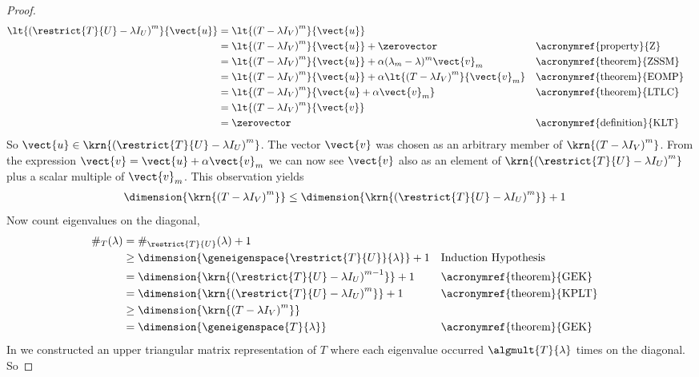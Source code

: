 \begin{proof}
\begin{align*}
\lt{\left(\restrict{T}{U}-\lambda I_U\right)^m}{\vect{u}}
&=
\lt{\left(T-\lambda I_V\right)^m}{\vect{u}}\\
%
&=
\lt{\left(T-\lambda I_V\right)^m}{\vect{u}}+\zerovector
&&\text{\acronymref{property}{Z}}\\
%
&=
\lt{\left(T-\lambda I_V\right)^m}{\vect{u}}+\alpha(\lambda_m-\lambda)^m\vect{v}_m
&&\text{\acronymref{theorem}{ZSSM}}\\
%
&=
\lt{\left(T-\lambda I_V\right)^m}{\vect{u}}+\alpha\lt{\left(T-\lambda I_V\right)^m}{\vect{v}_m}
&&\text{\acronymref{theorem}{EOMP}}\\
%
&=
\lt{\left(T-\lambda I_V\right)^m}{\vect{u}+\alpha\vect{v}_m}
&&\text{\acronymref{theorem}{LTLC}}\\
%
&=
\lt{\left(T-\lambda I_V\right)^m}{\vect{v}}\\
%
&=\zerovector
&&\text{\acronymref{definition}{KLT}}
%
\end{align*}
%
So $\vect{u}\in\krn{\left(\restrict{T}{U}-\lambda I_U\right)^m}$.  The vector $\vect{v}$ was chosen as an arbitrary member of
$\krn{\left(T-\lambda I_V\right)^m}$.  From the expression $\vect{v}=\vect{u}+\alpha\vect{v}_m$ we can now see $\vect{v}$ also as an element of $\krn{\left(\restrict{T}{U}-\lambda I_U\right)^m}$ plus a scalar multiple of  $\vect{v}_m$.  This observation yields
%
\begin{align*}
\dimension{\krn{\left(T-\lambda I_V\right)^m}}&\leq\dimension{\krn{\left(\restrict{T}{U}-\lambda I_U\right)^m}}+1
\end{align*}
%
Now count eigenvalues on the diagonal,
%
\begin{align*}
\#_{T}(\lambda)
&=\#_{\restrict{T}{U}}(\lambda)+1\\
%
&\geq\dimension{\geneigenspace{\restrict{T}{U}}{\lambda}}+1
&&\text{Induction Hypothesis}\\
%
&=\dimension{\krn{\left(\restrict{T}{U}-\lambda I_U\right)^{m-1}}}+1
&&\text{\acronymref{theorem}{GEK}}\\
%
&=\dimension{\krn{\left(\restrict{T}{U}-\lambda I_U\right)^m}}+1
&&\text{\acronymref{theorem}{KPLT}}\\
%
&\geq\dimension{\krn{\left(T-\lambda I_V\right)^m}}\\
%
&=\dimension{\geneigenspace{T}{\lambda}}
&&\text{\acronymref{theorem}{GEK}}\\
%
\end{align*}
%
In  we constructed an upper triangular matrix representation of $T$ where each eigenvalue occurred $\algmult{T}{\lambda}$ times on the diagonal.  So

\end{proof}
